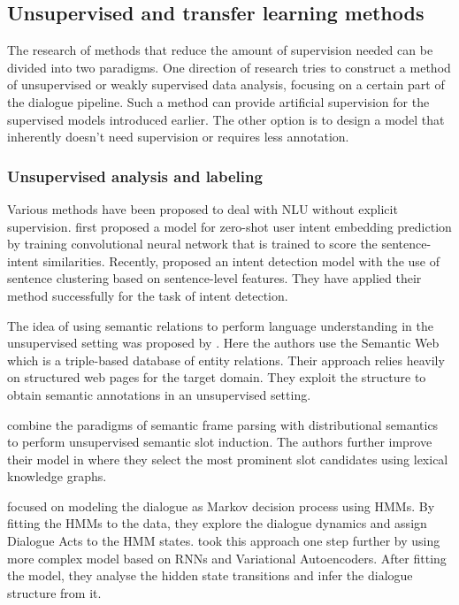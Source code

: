 \subsection{Unsupervised and transfer learning methods}
\label{sec:relwork-unsup}
The research of methods that reduce the amount of supervision needed can be divided into two paradigms.
One direction of research tries to construct a method of unsupervised or weakly supervised data analysis, focusing on a certain part of the dialogue pipeline.
Such a method can provide artificial supervision for the supervised models introduced earlier.
The other option is to design a model that inherently doesn't need supervision or requires less annotation.

\subsubsection{Unsupervised analysis and labeling}
Various methods have been proposed to deal with NLU without explicit  supervision.
\citet{chen2016zero} first proposed a model for zero-shot user intent embedding prediction by training convolutional neural network that is trained to score the sentence-intent similarities.
Recently, \citet{shi2018auto} proposed an intent detection model with the use of sentence clustering based on sentence-level features.
They have applied their method successfully for the task of intent detection.

The idea of using semantic relations to perform language understanding in the unsupervised setting was proposed by \citet{heck2012exploiting}.
Here the authors use the Semantic Web \cite{berners2001semantic} which is a triple-based database of entity relations.
Their approach relies heavily on structured web pages for the target domain.
They exploit the structure to obtain semantic annotations in an unsupervised setting.

\label{sec:relwork-chen}
\citet{chen2014leveraging} combine the paradigms of semantic frame parsing with distributional semantics to perform unsupervised semantic slot induction.
The authors further improve their model in \citet{chen2015jointly} where they select the most prominent slot candidates using lexical knowledge graphs.

\citet{brychcin2016unsupervised} focused on modeling the dialogue as Markov decision process using HMMs.
By fitting the HMMs to the data, they explore the dialogue dynamics and assign Dialogue Acts to the HMM states.
\citet{shi2019unsupervised} took this approach one step further by using more complex model based on RNNs and Variational Autoencoders.
After fitting the model, they analyse the hidden state transitions and infer the dialogue structure from it.
